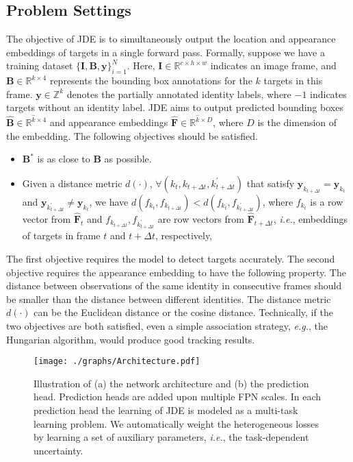 \documentclass[runningheads]{llncs}
\def\ie{\textit{i.e.}}
\begin{document}
\subsection{Problem Settings}
\label{sec:problemdef}
The objective of JDE is to simultaneously output the location and appearance embeddings of targets in a single forward pass. Formally, suppose we have a training dataset $\{\mathbf{I}, \mathbf{B}, \mathbf{y}\}_{i=1}^N$. Here, $\mathbf{I} \in \mathbb{R}^{c\times h \times w}$ indicates an image frame, and $\mathbf{B} \in \mathbb{R}^{k\times 4}$ represents the bounding box annotations for the $k$ targets in this frame. $\mathbf{y} \in \mathbb{Z}^{k}$ denotes the partially annotated identity labels, where $-1$ indicates targets without an identity label. JDE aims to output predicted bounding boxes $\hat{\mathbf{B}} \in \mathbb{R}^{\hat{k}\times 4}$ and appearance embeddings $\hat{\mathbf{F}} \in  \mathbb{R}^{\hat{k} \times D}$, where $D$ is the dimension of the embedding. The following objectives should be satisfied.
\begin{itemize}
    \item $\mathbf{B^{*}}$ is as close to $\mathbf{B}$ as possible.
    \item Given a distance metric $d(\cdot)$, $\forall (k_t, k_{t+\Delta t}, k_{t+\Delta t}^{\prime})$ that satisfy $\mathbf{y}_{k_{t+\Delta t}} = \mathbf{y}_{k_t}$ and   $\mathbf{y}_{k_{t+\Delta t}^{\prime}} \ne \mathbf{y}_{k_t}$, we have $d(f_{k_t},f_{k_{t+\Delta t}}) < d(f_{k_t},f_{k_{t+\Delta t}^{\prime}})$, where $f_{k_t}$ is a row vector from $ \hat{\mathbf{F}}_t$ and $f_{k_{t+\Delta t}}, f_{k_{t+\Delta t}^{\prime}}$ are row vectors from $ \hat{\mathbf{F}}_{t+\Delta t}$, \ie, embeddings of targets in frame $t$ and ${t+\Delta t}$, respectively, 
\end{itemize}

The first objective requires the model to detect targets accurately. The second objective requires the appearance embedding to have the following property. The distance between observations of the same identity in consecutive frames should be smaller than the distance between different identities. The distance metric $d(\cdot)$ can be the Euclidean distance or the cosine distance. Technically, if the two objectives are both satisfied, even a simple association strategy, \emph{e.g.}, the Hungarian algorithm, would produce good tracking results.


\begin{figure}[t]
    \centering
    \texttt{[image: ./graphs/Architecture.pdf]}
    \caption{Illustration of (a) the network architecture and (b) the prediction head. Prediction heads are added upon multiple FPN scales. In each prediction head the learning of JDE is modeled as a multi-task learning problem. We automatically weight the heterogeneous losses by learning a set of auxiliary parameters, \ie, the task-dependent uncertainty.}
    \label{fig:architecture}
\end{figure}
\end{document}
